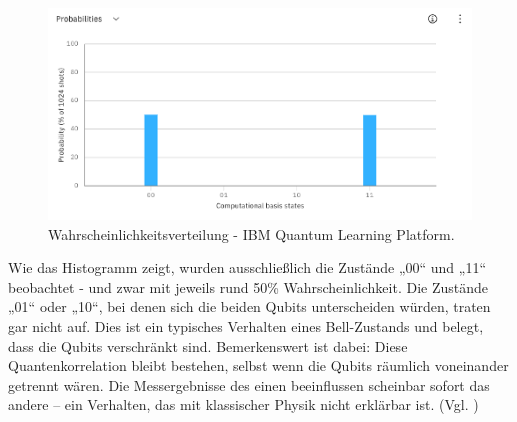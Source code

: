 \begin{figure}[ht]
    \centering
    \includegraphics[width=1\textwidth]{images/results_ibm.png}
    \caption{Wahrscheinlichkeitsverteilung - IBM Quantum Learning Platform.}
    \label{fig:meinbild}
\end{figure}


Wie das Histogramm zeigt, wurden ausschließlich die Zustände „00“ und „11“ beobachtet - und zwar mit jeweils rund 50\% Wahrscheinlichkeit. Die Zustände „01“ oder „10“, bei denen sich die beiden Qubits unterscheiden würden, traten gar nicht auf. Dies ist ein typisches Verhalten eines Bell-Zustands und belegt, dass die Qubits verschränkt sind. Bemerkenswert ist dabei: Diese Quantenkorrelation bleibt bestehen, selbst wenn die Qubits räumlich voneinander getrennt wären. Die Messergebnisse des einen beeinflussen scheinbar sofort das andere – ein Verhalten, das mit klassischer Physik nicht erklärbar ist. (Vgl. \cite{Bell State ZZ-Measurement}) 


\printbibliography
